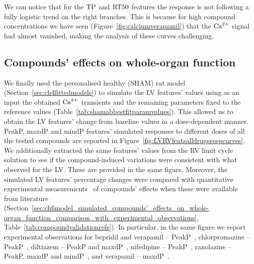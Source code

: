 \vspace{0.2cm}\noindent
We can notice that for the $\textrm{TP}$ and $\textrm{RT50}$ features the response is not following a fully logistic trend on the right branches. This is because for high compound concentrations we have seen (Figure~\ref{fig:calciumverapamil}) that the $\textrm{Ca}^{2+}$ signal had almost vanished, making the analysis of these curves challenging.


%
%
%
\subsection{Compounds' effects on whole-organ function}\label{sec:ch6compounds_effects_on_the_whole_organ_function}
We finally used the personalised healthy (SHAM) rat model (Section~\ref{sec:ch4fittedmodels}) to simulate the LV features' values using as an input the obtained $\textrm{Ca}^{2+}$ transients and the remaining parameters fixed to the reference values (Table~\ref{tab:shamabbestfitparamvalues}). This allowed us to obtain the LV features' change from baseline values in a dose-dependent manner. PeakP, maxdP and mindP features' simulated responses to different doses of all the tested compounds are reported in Figure~\ref{fig:LVRVfeatsalldrugsrespcurves}. We additionally extracted the same features' values from the RV limit cycle solution to see if the compound-induced variations were consistent with what observed for the LV. These are provided in the same figure. Moreover, the simulated LV features' percentage changes were compared with quantitative experimental measurements~\cite{Amsterdam:1988,Langslet:1971,Koltai:1989,Saponara:2007,Wang:2007,Kolar:1990} of compounds' effects when these were available from literature (Section~\ref{sec:ch6model_simulated_compounds'_effects_on_whole-organ_function_comparison_with_experimental_observations}, Table~\ref{tab:compoundvalidationrefs}). In particular, in the same figure we report experimental observations for bepridil and verapamil -- PeakP~\cite{Amsterdam:1988}, chlorpromazine -- PeakP~\cite{Langslet:1971}, diltiazem -- PeakP and maxdP~\cite{Koltai:1989}, nifedipine -- PeakP~\cite{Saponara:2007}, ranolazine -- PeakP, maxdP and mindP~\cite{Wang:2007}, and verapamil -- maxdP~\cite{Kolar:1990}.

